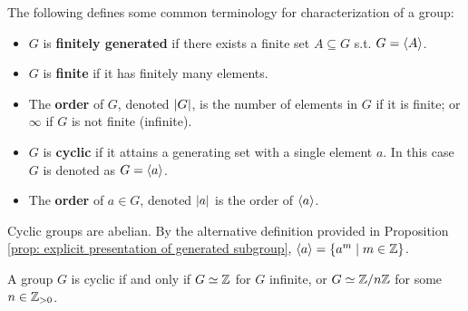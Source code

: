 \begin{definition}
    The following defines some common terminology for characterization of a group:
    \begin{itemize}
        \item $G$ is \textbf{finitely generated} if there exists a finite set $A \subseteq G$ s.t. $G = \left\langle A \right\rangle$.
        \item $G$ is \textbf{finite} if it has finitely many elements. 
        \item The \textbf{order} of $G$, denoted $\left|G\right|$, is the number of elements in $G$ if it is finite; or $\infty$ if $G$ is not finite (infinite).
        \item $G$ is \textbf{cyclic} if it attains a generating set with a single element $a$. In this case $G$ is denoted as $G = \left\langle a \right\rangle$.
        \item The \textbf{order} of $a \in G$, denoted $\left|a\right|$ is the order of $\left\langle a \right\rangle$.  
    \end{itemize}
\end{definition}

\begin{remark}
    Cyclic groups are abelian. By the alternative definition provided in Proposition \ref{prop: explicit presentation of generated subgroup}, $\left\langle a \right\rangle = \{ a^m \mid m \in \mathbb{Z} \}$.
\end{remark}

\begin{proposition}\label{prop: characterization of cyclic group}
    A group $G$ is cyclic if and only if $G \simeq \mathbb{Z}$ for $G$ infinite, or $G \simeq \mathbb{Z}/n\mathbb{Z}$ for some $n \in \mathbb{Z}_{>0}$.  
\end{proposition}

